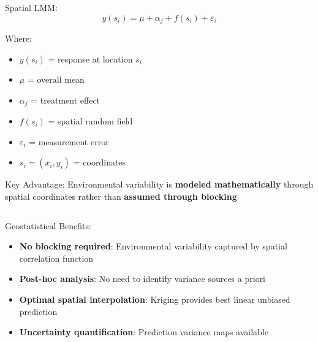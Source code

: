 \documentclass[aspectratio=43]{beamer}
\begin{document}
\begin{frame}
\begin{columns}
        \begin{column}{0.35\textwidth}
            \begin{block}{Spatial LMM:}
                \begin{equation*}
                    y(s_i) = \mu + \alpha_j + f(s_i) + \varepsilon_i
                \end{equation*}
                
                \small
                Where:
                \begin{itemize}
                    \item $y(s_i)$ = response at location $s_i$
                    \item $\mu$ = overall mean
                    \item $\alpha_j$ = treatment effect
                    \item $f(s_i)$ = spatial random field
                    \item $\varepsilon_i$ = measurement error
                    \item $s_i = (x_i, y_i)$ = coordinates
                \end{itemize}
            \end{block}
            
            \begin{exampleblock}{\small Key Advantage:}
                {\tiny Environmental variability is \textbf{modeled mathematically} through spatial coordinates rather than \textbf{assumed through blocking}}
            \end{exampleblock}
        \end{column}
    \end{columns}
    
    \begin{block}{\small Geostatistical Benefits:}
        \scriptsize
        \begin{itemize}
            \item \textbf{No blocking required}: Environmental variability captured by spatial correlation function
            \item \textbf{Post-hoc analysis}: No need to identify variance sources a priori
            \item \textbf{Optimal spatial interpolation}: Kriging provides best linear unbiased prediction
            \item \textbf{Uncertainty quantification}: Prediction variance maps available
        \end{itemize}
    \end{block}
\end{frame}
\end{document}
